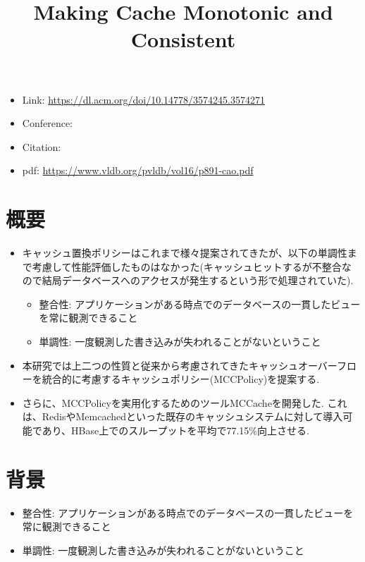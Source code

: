 \documentclass[dvipdfmx,uplatex]{jsarticle}
\title{Making Cache Monotonic and Consistent}
\author{\empty}
\date{\empty}
\theoremstyle{remark}
\newenvironment{simplebox}{
    \begin{tcolorbox}[
        fonttitle=\bfseries,
    ]
}{
    \end{tcolorbox}
}
\begin{document}
\maketitle

\begin{itemize}
    \item Link: \url{https://dl.acm.org/doi/10.14778/3574245.3574271}
    \item Conference:
    \item Citation: \cite{cache-consistent}
    \item pdf: \url{https://www.vldb.org/pvldb/vol16/p891-cao.pdf}
\end{itemize}


\section{概要}
\begin{simplebox}
\begin{itemize}
    \item キャッシュ置換ポリシーはこれまで様々提案されてきたが、以下の単調性まで考慮して性能評価したものはなかった(キャッシュヒットするが不整合なので結局データベースへのアクセスが発生するという形で処理されていた).
    \begin{itemize}
        \item 整合性: アプリケーションがある時点でのデータベースの一貫したビューを常に観測できること
        \item 単調性: 一度観測した書き込みが失われることがないということ
    \end{itemize}
    \item 本研究では上二つの性質と従来から考慮されてきたキャッシュオーバーフローを統合的に考慮するキャッシュポリシー(MCCPolicy)を提案する.
    \item さらに、MCCPolicyを実用化するためのツールMCCacheを開発した. これは、RedisやMemcachedといった既存のキャッシュシステムに対して導入可能であり、HBase上でのスループットを平均で77.15\%向上させる.
\end{itemize}
\end{simplebox}

\section{背景}
\begin{simplebox}
\begin{itemize}
    \item 整合性: アプリケーションがある時点でのデータベースの一貫したビューを常に観測できること
    \item 単調性: 一度観測した書き込みが失われることがないということ
\end{itemize}
\end{simplebox}
\end{document}
